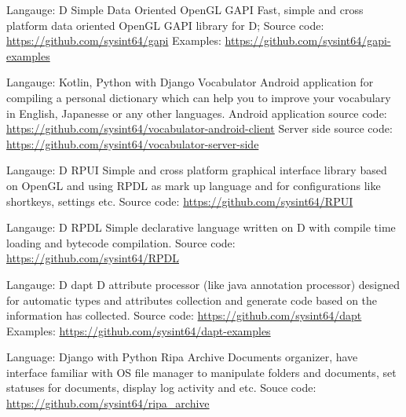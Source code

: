 \begin{cventries}


\cventry
{Langauge: D}
{Simple Data Oriented OpenGL GAPI}
{}
{}
{
Fast, simple and cross platform data oriented OpenGL GAPI library for D;\linebreak
Source code: \url{https://github.com/sysint64/gapi}\linebreak
Examples: \url{https://github.com/sysint64/gapi-examples}\linebreak
}

\cventry
{Langauge: Kotlin, Python with Django}
{Vocabulator}
{}
{}
{
Android application for compiling a personal dictionary which can help you to improve your vocabulary in English, Japanesse or any other languages.\linebreak
Android application source code: \url{https://github.com/sysint64/vocabulator-android-client}\linebreak
Server side source code: \url{https://github.com/sysint64/vocabulator-server-side}\linebreak
}

\cventry
{Langauge: D}
{RPUI}
{}
{}
{
Simple and cross platform graphical interface library based on OpenGL and using RPDL as mark up language
and for configurations like shortkeys, settings etc.\linebreak
Source code: \url{https://github.com/sysint64/RPUI}
}

\cventry
{Langauge: D}
{RPDL}
{}
{}
{
Simple declarative language written on D with compile time loading and bytecode compilation.\linebreak
Source code: \url{https://github.com/sysint64/RPDL}
}

\cventry
{Langauge: D}
{dapt}
{}
{}
{
D attribute processor (like java annotation processor) designed for automatic types and attributes collection and generate
code based on the information has collected.\linebreak
Source code: \url{https://github.com/sysint64/dapt}\linebreak
Examples: \url{https://github.com/sysint64/dapt-examples}
}

\cventry
{Language: Django with Python}
{Ripa Archive}
{}
{}
{
Documents organizer, have interface familiar with OS file manager to manipulate folders and documents, set statuses
for documents, display log activity and etc.\linebreak
Souce code: \url{https://github.com/sysint64/ripa_archive}
}


\end{cventries}
